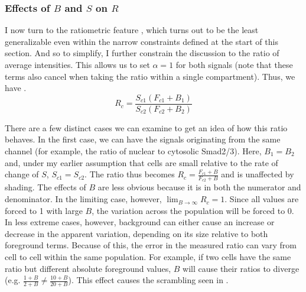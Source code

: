 \subsubsection{Effects of $B$ and $S$ on $R$}


I now turn to the ratiometric feature , 
which turns out to be
the least generalizable even within the narrow constraints defined
at the start of this section. And so to simplify, I further constrain
the discussion to the ratio of average intensities. This allows us
to set $\alpha=1$ for both signals (note that these terms also
cancel when taking the ratio within a single compartment). Thus, we have
.
	\begin{equation} \label{eq:correction:ratioMeans}
	R_c = \frac{ S_{c1}(F_{c1}+B_1) }
	{S_{c2}(F_{c2}+B_2) } 
	\end{equation}


There are a few distinct cases we can examine to get an idea of
how this ratio behaves. In the first case, we can have the signals
originating from the same channel (for example, the ratio of
nuclear to cytosolic Smad2/3). Here, $B_1=B_2$ and, under my
earlier assumption that cells are small relative to the rate
of change of $S$, $S_{c1}=S_{c2}$. The ratio thus becomes
$R_c=\frac{F_{c1}+B}{F_{c2}+B}$ and is unaffected by shading.
The effects of $B$ are less obvious because it
is in both the numerator and denominator. In the limiting case,
however, $\lim_{B\rightarrow \infty} R_c=1$. Since all values
are forced to 1 with large $B$, the variation across the population
will be forced to 0. In less extreme
cases, however, background can either cause an increase
or decrease in
the apparent variation, depending on its size relative to
both foreground terms. Because of this, the error in the
measured ratio can vary from cell to cell within the same
population. For example, if two cells have the same ratio
but different absolute foreground values, $B$ will cause their
ratios to diverge (e.g. $\frac{1+B}{2+B}\neq\frac{10+B}{20+B}$).
This effect causes the scrambling seen in .


